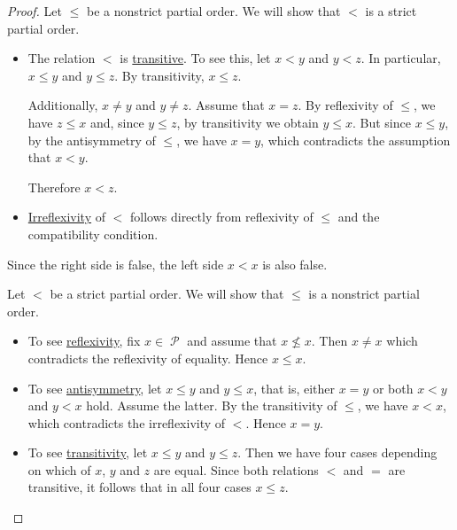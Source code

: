 \begin{proof}
   Let \( \leq \) be a nonstrict partial order. We will show that \( < \) is a strict partial order.

  \begin{itemize}
    \item The relation \( < \) is \hyperref[def:binary_relation/transitive]{transitive}. To see this, let \( x < y \) and \( y < z \). In particular, \( x \leq y \) and \( y \leq z \). By transitivity, \( x \leq z \).

    Additionally, \( x \neq y \) and \( y \neq z \). Assume that \( x = z \). By reflexivity of \( \leq \), we have \( z \leq x \) and, since \( y \leq z \), by transitivity we obtain \( y \leq x \). But since \( x \leq y \), by the antisymmetry of \( \leq \), we have \( x = y \), which contradicts the assumption that \( x < y \).

    Therefore \( x < z \).

    \item \hyperref[def:binary_relation/irreflexive]{Irreflexivity} of \( < \) follows directly from reflexivity of \( \leq \) and the compatibility condition.
  \end{itemize}

  Since the right side is false, the left side \( x < x \) is also false.

   Let \( < \) be a strict partial order. We will show that \( \leq \) is a nonstrict partial order.

  \begin{itemize}
    \item To see \hyperref[def:binary_relation/reflexive]{reflexivity}, fix \( x \in \mscrP \) and assume that \( x \not\leq x \). Then \( x \neq x \) which contradicts the reflexivity of equality. Hence \( x \leq x \).

    \item To see \hyperref[def:binary_relation/antisymmetric]{antisymmetry}, let \( x \leq y \) and \( y \leq x \), that is, either \( x = y \) or both \( x < y \) and \( y < x \) hold. Assume the latter. By the transitivity of \( \leq \), we have \( x < x \), which contradicts the irreflexivity of \( < \). Hence \( x = y \).

    \item To see \hyperref[def:binary_relation/transitive]{transitivity}, let \( x \leq y \) and \( y \leq z \). Then we have four cases depending on which of \( x \), \( y \) and \( z \) are equal. Since both relations \( < \) and \( = \) are transitive, it follows that in all four cases \( x \leq z \).
  \end{itemize}
\end{proof}


